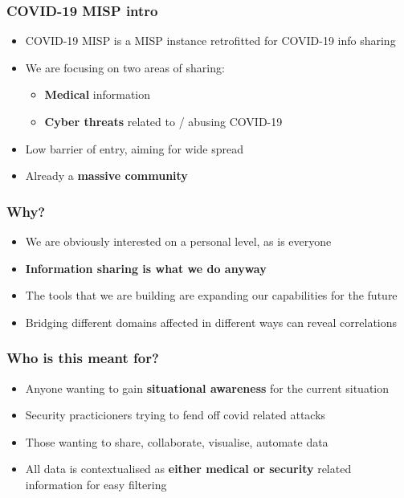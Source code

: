 
\begin{frame}[t,plain]
\titlepage
\end{frame}

\begin{frame}
 \frametitle{COVID-19 MISP intro}
 \begin{itemize}
         \item COVID-19 MISP is a MISP instance retrofitted for COVID-19 info sharing
         \item We are focusing on two areas of sharing:
         \begin{itemize}
              \item {\bf Medical} information
              \item {\bf Cyber threats} related to / abusing COVID-19
         \end{itemize}
         \item Low barrier of entry, aiming for wide spread
         \item Already a {\bf massive community}
 \end{itemize}
\end{frame}

\begin{frame}
 \frametitle{Why?}
 \begin{itemize}
         \item We are obviously interested on a personal level, as is everyone
         \item {\bf Information sharing is what we do anyway}
         \item The tools that we are building are expanding our capabilities for the future
         \item Bridging different domains affected in different ways can reveal correlations
 \end{itemize}
\end{frame}

\begin{frame}
 \frametitle{Who is this meant for?}
 \begin{itemize}
         \item Anyone wanting to gain {\bf situational awareness} for the current situation
         \item Security practicioners trying to fend off covid related attacks
         \item Those wanting to share, collaborate, visualise, automate data
         \item All data is contextualised as {\bf either medical or security} related information for easy filtering
 \end{itemize}
\end{frame}


